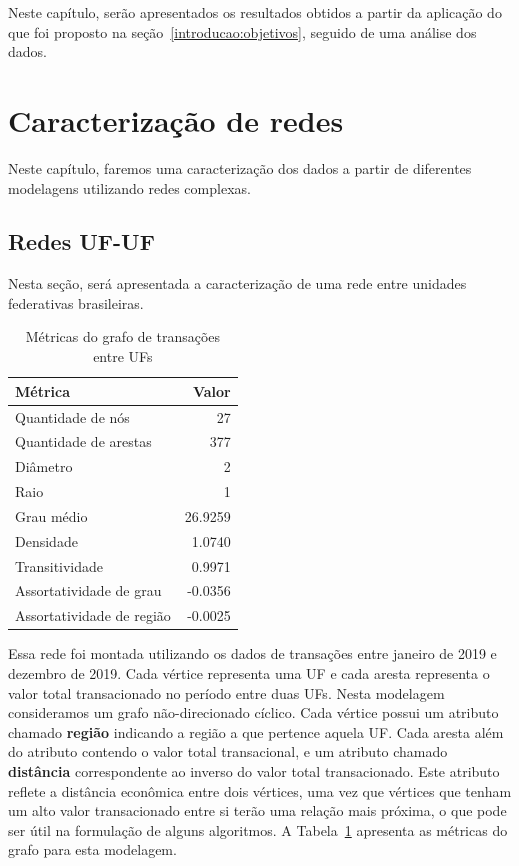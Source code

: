 
Neste capítulo, serão apresentados os resultados obtidos a partir da aplicação do que foi proposto na seção~\ref{introducao:objetivos}, seguido de uma análise dos dados.

\section{Caracterização de redes}
\label{section:metricas-redes}

Neste capítulo, faremos uma caracterização dos dados a partir de diferentes modelagens utilizando redes complexas.

\subsection{Redes UF-UF}
\label{section:metricas-redes:uf}

Nesta seção, será apresentada a caracterização de uma rede entre unidades federativas brasileiras.

\begin{table}[htb]
\centering
\caption{Métricas do grafo de transações entre UFs}
\label{tab:metricas-redes:grafo-por-uf}
    \begin{tabular}{l|r}
    \toprule
    Métrica &  Valor \\
    \midrule
    Quantidade de nós         &  27      \\
    Quantidade de arestas     & 377      \\
    Diâmetro                  &   2      \\
    Raio                      &   1      \\
    Grau médio                &  26.9259 \\
    Densidade                 &   1.0740 \\
    Transitividade            &   0.9971 \\
    Assortatividade de grau   &  -0.0356 \\
    Assortatividade de região &  -0.0025 \\
    \bottomrule
    \end{tabular}
\fdadospesquisa
\end{table}

Essa rede foi montada utilizando os dados de transações entre janeiro de 2019 e dezembro de 2019. Cada vértice representa uma UF e cada aresta representa o valor total transacionado no período entre duas UFs. Nesta modelagem consideramos um grafo não-direcionado cíclico. Cada vértice possui um atributo chamado \textbf{região} indicando a região a que pertence aquela UF. Cada aresta além do atributo contendo o valor total transacional, e um atributo chamado \textbf{distância} correspondente ao inverso do valor total transacionado. Este atributo reflete a distância econômica entre dois vértices, uma vez que vértices que tenham um alto valor transacionado entre si terão uma relação mais próxima, o que pode ser útil na formulação de alguns algoritmos. A Tabela~\ref{tab:metricas-redes:grafo-por-uf} apresenta as métricas do grafo para esta modelagem.

